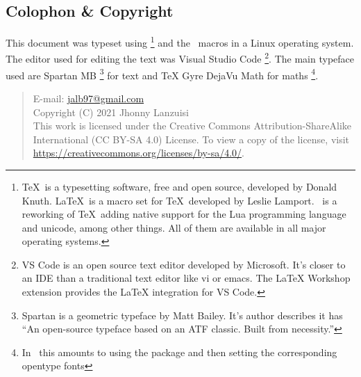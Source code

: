 \newpage
\begin{small}
    \begin{center}
    \begin{minipage}{0.4\paperwidth}
        \section*{Colophon \& Copyright}
        This document was typeset using \LuaTeX%
        \footnote{%
            \TeX\ is
            a typesetting software, free and open source,
            developed by Donald Knuth. \LaTeX\ is a macro
            set for \TeX\ developed by Leslie Lamport. \LuaTeX\ is
            a reworking of \TeX\ adding native support for the Lua
            programming language and unicode, among other things.
            All of them are available in all major
            operating systems.
        }
        and the \LaTeXe\ macros in a Linux operating system.
        The editor used for editing the text was Visual Studio Code%
        \footnote{%
            VS Code is an open source text editor
            developed by Microsoft.
            It's closer to an IDE than a traditional text editor
            like vi or emacs.
            The LaTeX Workshop extension provides the LaTeX
            integration for VS Code.
        }.
        The main typeface used are Spartan MB%
        \footnote{%
            Spartan is a geometric typeface
            by Matt Bailey. It's author describes it has
            ``An open-source typeface based on an ATF classic. 
            Built from necessity.''
        }
        for text and TeX Gyre DejaVu Math for maths%
        \footnote{%
            In \LuaLaTeX\ this amounts to using the package
            and then setting the corresponding
            opentype fonts
        }.

        \medskip
        \begin{quote}\ttfamily\raggedright%
            E-mail: \url{jalb97@gmail.com} \\
            Copyright (C) 2021 Jhonny Lanzuisi \\
            This work is licensed under the Creative Commons Attribution-ShareAlike
            International (CC BY-SA 4.0)  License. To view a copy of the license,
            visit \url{https://creativecommons.org/licenses/by-sa/4.0/}.
        \end{quote}
    \end{minipage}
    \end{center}
\end{small}
\newpage
\tableofcontents
